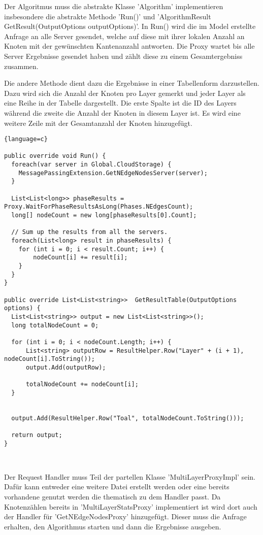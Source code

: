 Der Algoritmus muss die abstrakte Klasse 'Algorithm' implementieren insbesondere die abstrakte Methode 'Run()' und 'AlgorithmResult GetResult(OutputOptions outputOptions)'. In Run() wird die im Model erstellte Anfrage an alle Server gesendet, welche auf diese mit ihrer lokalen Anzahl an Knoten mit der gewünschten Kantenanzahl antworten. Die Proxy
wartet bis alle Server Ergebnisse gesendet haben und zählt diese zu einem Gesamtergebniss zusammen.

Die andere Methode dient dazu die Ergebnisse in einer Tabellenform darzustellen. Dazu wird sich die Anzahl der Knoten pro Layer gemerkt und jeder Layer als eine Reihe in der Tabelle dargestellt. Die erste Spalte ist die ID des Layers während die zweite die Anzahl der Knoten in diesem Layer ist. Es wird eine weitere Zeile mit der Gesamtanzahl der Knoten hinzugefügt.

\begin{lstlisting}{language=c}

public override void Run() {
  foreach(var server in Global.CloudStorage) {
    MessagePassingExtension.GetNEdgeNodesServer(server);
  }

  List<List<long>> phaseResults =  Proxy.WaitForPhaseResultsAsLong(Phases.NEdgesCount);
  long[] nodeCount = new long[phaseResults[0].Count];

  // Sum up the results from all the servers.
  foreach(List<long> result in phaseResults) {
    for (int i = 0; i < result.Count; i++) {
        nodeCount[i] += result[i];
    }
  }
}

public override List<List<string>>  GetResultTable(OutputOptions options) {
  List<List<string>> output = new List<List<string>>();
  long totalNodeCount = 0;

  for (int i = 0; i < nodeCount.Length; i++) {
      List<string> outputRow = ResultHelper.Row("Layer" + (i + 1), nodeCount[i].ToString()); 
      output.Add(outputRow);

      totalNodeCount += nodeCount[i];
  }


  output.Add(ResultHelper.Row("Toal", totalNodeCount.ToString()));

  return output;
}



\end{lstlisting}


Der Request Handler muss Teil der partellen Klasse 'MultiLayerProxyImpl' sein. Dafür kann entweder eine weitere Datei erstellt werden oder eine bereits vorhandene genutzt werden die thematisch zu dem Handler passt.
Da Knotenzählen bereits in 'MultiLayerStatsProxy' implementiert ist wird dort auch der Handler für 'GetNEdgeNodesProxy' hinzugefügt. Dieser muss die Anfrage erhalten, den Algorithmus starten und dann die Ergebnisse ausgeben.

